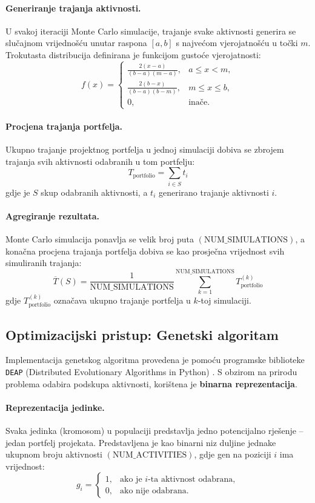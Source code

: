 \paragraph{Generiranje trajanja aktivnosti.}
U svakoj iteraciji Monte Carlo simulacije, trajanje svake aktivnosti generira se slučajnom vrijednošću 
unutar raspona $[a, b]$ s najvećom vjerojatnošću u točki $m$.  
Trokutasta distribucija definirana je funkcijom gustoće vjerojatnosti:
\[
f(x) =
\begin{cases}
\frac{2(x-a)}{(b-a)(m-a)}, & a \leq x < m, \\
\frac{2(b-x)}{(b-a)(b-m)}, & m \leq x \leq b, \\
0, & \text{inače}.
\end{cases}
\]

\paragraph{Procjena trajanja portfelja.}
Ukupno trajanje projektnog portfelja u jednoj simulaciji dobiva se zbrojem trajanja svih aktivnosti odabranih u tom portfelju:
\[
T_{\text{portfolio}} = \sum_{i \in S} t_i
\]
gdje je $S$ skup odabranih aktivnosti, a $t_i$ generirano trajanje aktivnosti $i$.

\paragraph{Agregiranje rezultata.}
Monte Carlo simulacija ponavlja se velik broj puta $(\text{NUM\_SIMULATIONS})$, a konačna procjena trajanja portfelja 
dobiva se kao prosječna vrijednost svih simuliranih trajanja:
\[
\overline{T}(S) = \frac{1}{\text{NUM\_SIMULATIONS}} \sum_{k=1}^{\text{NUM\_SIMULATIONS}} T_{\text{portfolio}}^{(k)}
\]
gdje $T_{\text{portfolio}}^{(k)}$ označava ukupno trajanje portfelja u $k$-toj simulaciji.

\subsection{Optimizacijski pristup: Genetski algoritam}

Implementacija genetskog algoritma provedena je pomoću programske biblioteke \texttt{DEAP} (Distributed Evolutionary Algorithms in Python) \cite{DEAP2012}. 
S obzirom na prirodu problema odabira podskupa aktivnosti, korištena je \textbf{binarna reprezentacija}.

\paragraph{Reprezentacija jedinke.}
Svaka jedinka (kromosom) u populaciji predstavlja jedno potencijalno rješenje – jedan portfelj projekata. 
Predstavljena je kao binarni niz duljine jednake ukupnom broju aktivnosti $(\text{NUM\_ACTIVITIES})$, gdje gen na poziciji $i$ ima vrijednost:
\[
g_i =
\begin{cases}
1, & \text{ako je $i$-ta aktivnost odabrana}, \\
0, & \text{ako nije odabrana}.
\end{cases}
\]

